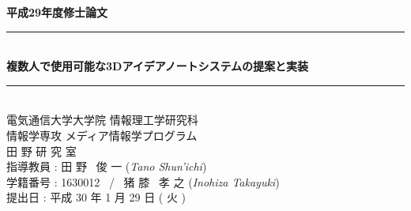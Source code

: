 \documentclass[11pt,a4j, titlepage]{jarticle} %
\begin{document}
\begin{titlepage}
	\begin{center}
		\vspace{8ex}
		{\Large \bf 平成29年度修士論文}
		\vspace{3ex}\\
		\rule{\hsize}{2mm}
		\vspace{1mm}\\ 
		{\LARGE \bf 複数人で使用可能な3Dアイデアノートシステムの提案と実装} 
		\vspace{6mm}\\ 
		\rule{\hsize}{2mm} 
		\vspace{2.5cm} \\ 
		{\Large 電気通信大学大学院 情報理工学研究科 \\ 
		情報学専攻 メディア情報学プログラム} 
		\vspace{2ex} \\ 
		\renewcommand{\thefootnote}{\fnsymbol{footnote}} 
		{\Large 田 野 研 究 室} 
		\vspace{3ex} \\ 
		{\Large 指導教員 : 田 野 \ 俊 一 ({\em Tano Shun'ichi})} 
		\vspace{3ex} \\
		{\Large 学籍番号 : 1630012 \ / \ 猪 膝 \ 孝 之 ({\em Inohiza Takayuki})} 
		\vspace{5ex} \\ 
		{\Large 提出日 : 平成 30 年 1 月 29 日 ( 火 )} 
		\vspace{-5ex} \\ 
		\begin{verbatim} 
		\end{verbatim} 
	\end{center} 
\end{titlepage}
\end{document}
